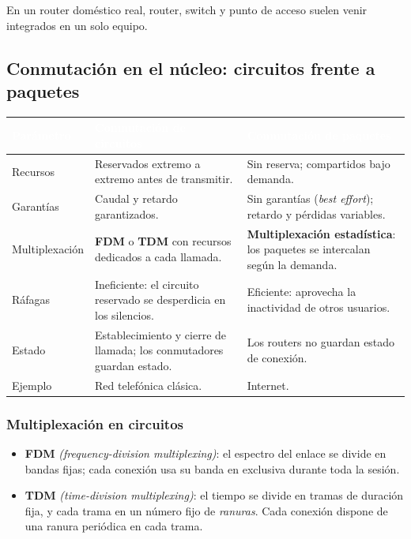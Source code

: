 \documentclass[11pt,a4paper]{article}
\newcommand{\hd}[1]{\cellcolor{uahblue}\textcolor{white}{\textbf{#1}}}
\newcommand{\en}[1]{\emph{(#1)}}
\begin{document}
En un router doméstico real, router, switch y punto de acceso suelen venir integrados en un solo equipo.


\subsection{Conmutación en el núcleo: circuitos frente a paquetes}

\begin{tabularx}{\textwidth}{@{}L{3.2cm}XX@{}}
\toprule
\hd{Parámetro} & \hd{Conmutación de circuitos} & \hd{Conmutación de paquetes} \\
\midrule
Recursos & Reservados extremo a extremo antes de transmitir. & Sin reserva; compartidos bajo demanda. \\
Garantías & Caudal y retardo garantizados. & Sin garantías (\emph{best effort}); retardo y pérdidas variables. \\
Multiplexación & \textbf{FDM} o \textbf{TDM} con recursos dedicados a cada llamada. & \textbf{Multiplexación estadística}: los paquetes se intercalan según la demanda. \\
Ráfagas & Ineficiente: el circuito reservado se desperdicia en los silencios. & Eficiente: aprovecha la inactividad de otros usuarios. \\
Estado & Establecimiento y cierre de llamada; los conmutadores guardan estado. & Los routers no guardan estado de conexión. \\
Ejemplo & Red telefónica clásica. & Internet. \\
\bottomrule
\end{tabularx}

\subsubsection{Multiplexación en circuitos}

\begin{itemize}
  \item \textbf{FDM} \en{frequency-division multiplexing}: el espectro del enlace se divide en bandas fijas; cada conexión usa su banda en exclusiva durante toda la sesión.
  \item \textbf{TDM} \en{time-division multiplexing}: el tiempo se divide en tramas de duración fija, y cada trama en un número fijo de \emph{ranuras}. Cada conexión dispone de una ranura periódica en cada trama.
\end{itemize}
\end{document}
